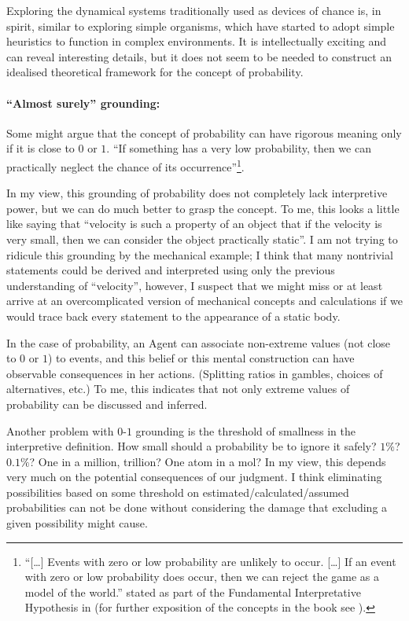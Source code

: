 \documentclass{article}
\begin{document}
Exploring the dynamical systems traditionally used as devices of chance is, in spirit, similar to exploring simple organisms, which have started to adopt simple heuristics to function in complex environments. It is intellectually exciting and can reveal interesting details, but it does not seem to be needed to construct an idealised theoretical framework for the concept of probability.



\paragraph{``Almost surely'' grounding:}
Some might argue that the concept of probability can have rigorous meaning only if it is close to $0$ or $1$. ``If something has a very low probability, then we can practically neglect the chance of its occurrence''\footnote{``[\dots] Events with zero or low probability are unlikely to occur. [\dots] If an event with zero or low probability does occur, then we can reject the game as a model of the world.'' stated as part of the Fundamental Interpretative Hypothesis in \cite{book:ProbabilityAndFinanceGame} (for further exposition of the concepts in the book see \cite{book:GameTheoreticProbability}).}.

In my view, this grounding of probability does not completely lack interpretive power, but we can do much better to grasp the concept. To me, this looks a little like saying that ``velocity is such a property of an object that if the velocity is very small, then we can consider the object practically static''. I am not trying to ridicule this grounding by the mechanical example; I think that many nontrivial statements could be derived and interpreted using only the previous understanding of ``velocity'', however, I suspect that we might miss or at least arrive at an overcomplicated version of mechanical concepts and calculations if we would trace back every statement to the appearance of a static body.

In the case of probability, an Agent can associate non-extreme values (not close to $0$ or $1$) to events, and this belief or this mental construction can have observable consequences in her actions. (Splitting ratios in gambles, choices of alternatives, etc.)
To me, this indicates that not only extreme values of probability can be discussed and inferred.

Another problem with $0$-$1$ grounding is the threshold of smallness in the interpretive definition. How small should a probability be to ignore it safely? $1\%$? $0.1\%$? One in a million, trillion? One atom in a mol?
In my view, this depends very much on the potential consequences of our judgment. I think eliminating possibilities based on some threshold on estimated/calculated/assumed probabilities can not be done without considering the damage that excluding a given possibility might cause.
\end{document}
